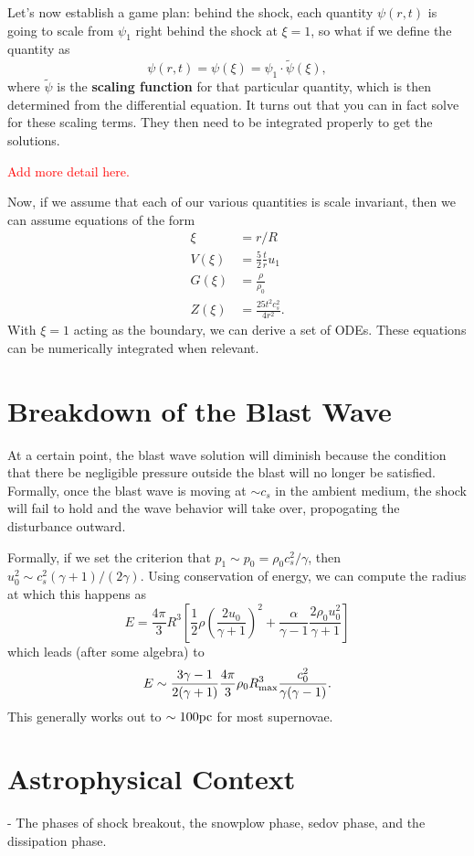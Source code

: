 Let's now establish a game plan: behind the shock, each quantity $\psi(r,t)$ is going to scale from $\psi_1$ right behind the shock at $\xi=1$, so what if we define the quantity as 
\[
\psi(r,t) = \psi(\xi) = \psi_1 \cdot \tilde{\psi}(\xi),
\]
where $\tilde{\psi}$ is the \textbf{scaling function} for that particular quantity, which is then determined from the differential equation. It turns out that you can in fact solve for these scaling terms. They then need to be integrated properly to get the solutions.

\textcolor{red}{Add more detail here.}


Now, if we assume that each of our various quantities is scale invariant, then we can assume equations of the form
\[
\begin{aligned}
    \xi &= r/R\\
    V(\xi) &= \frac{5}{2}\frac{t}{r} u_1\\
    G(\xi) &= \frac{\rho}{\rho_0}\\
    Z(\xi) &= \frac{25 t^2 c_s^2}{4r^2}.
\end{aligned}
\]
 With $\xi = 1$ acting as the boundary, we can derive a set of ODEs. These equations can be numerically integrated when relevant.

\section{Breakdown of the Blast Wave}
At a certain point, the blast wave solution will diminish because the condition that there be negligible pressure outside the blast will no longer be satisfied. Formally, once the blast wave is moving at $\sim c_s$ in the ambient medium, the shock will fail to hold and the wave behavior will take over, propogating the disturbance outward.

Formally, if we set the criterion that $p_1 \sim p_0 = \rho_0 c_s^2/\gamma$, then $u_0^2 \sim c_s^2(\gamma +1)/(2\gamma).$ Using conservation of energy, we can compute the radius at which this happens as
\[
E = \frac{4\pi }{3} R^3 \left[\frac{1}{2}\rho \left(\frac{2u_0}{\gamma +1}\right)^2 + \frac{\alpha}{\gamma -1} \frac{2\rho_0 u_0^2}{\gamma +1}\right]
\]
which leads (after some algebra) to
\[
E \sim \frac{3\gamma - 1}{2(\gamma + 1)} \frac{4\pi}{3}\rho_0 R^3_{\rm max} \frac{c_0^2}{\gamma(\gamma -1)}.
\]
This generally works out to $\sim 100 {\rm pc}$ for most supernovae.

\section{Astrophysical Context}

- The phases of shock breakout, the snowplow phase, sedov phase, and the dissipation phase.
